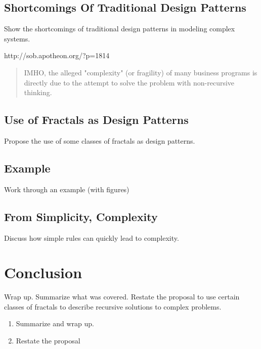 \documentclass[jou,apacite]{apa6}
\begin{document}
\subsection{Shortcomings Of Traditional Design Patterns}
Show the shortcomings of traditional design patterns in modeling complex systems.

http://sob.apotheon.org/?p=1814

\begin{quote}
IMHO, the alleged "complexity" (or fragility) of many business programs is directly due to the attempt to solve the problem with non-recursive thinking.
\end{quote}

\subsection{Use of Fractals as Design Patterns}
Propose the use of some classes of fractals as design patterns.

\subsection{Example}
Work through an example (with figures)

\subsection{From Simplicity, Complexity}
Discuss how simple rules can quickly lead to complexity.

\section{Conclusion}  %
Wrap up.  Summarize what was covered.  Restate the proposal to use certain classes of fractals to describe recursive solutions to complex problems.
\begin{enumerate}
  \item Summarize and wrap up.
  \item Restate the proposal
\end{enumerate}


\end{document}
